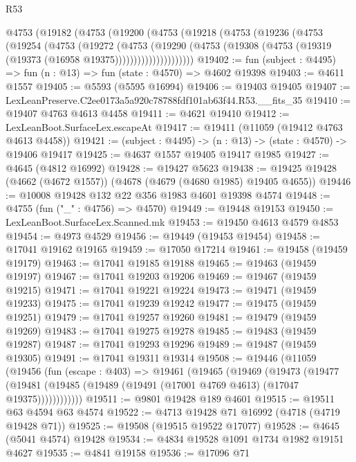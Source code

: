 \begin{lexlean}{R53}
\begin{coremodule}
      @4753
        (@19182
          (@4753
            (@19200
              (@4753
                (@19218
                  (@4753
                    (@19236
                      (@4753
                        (@19254
                          (@4753
                            (@19272
                              (@4753
                                (@19290
                                  (@4753
                                    (@19308
                                      (@4753 (@19319 (@19373 (@16958 @19375)))))))))))))))))))))
@19402 := fun (subject : @4495) => fun (n : @13) => fun (state : @4570) => @4602 @19398
@19403 := @4611 @1557
@19405 := @5593 (@5595 @16994)
@19406 := @19403 @19405
@19407 := LexLeanPreserve.C2ee0173a5a920c78788fdf101ab63f44.R53.__fits_35
@19410 := @19407 @4763 @4613 @4458
@19411 := @4621 @19410
@19412 := LexLeanBoot.SurfaceLex.escapeAt
@19417 := @19411 (@11059 (@19412 @4763 @4613 @4458))
@19421 := (subject : @4495) -> (n : @13) -> (state : @4570) -> @19406 @19417
@19425 := @4637 @1557 @19405 @19417 @1985
@19427 := @4645 (@4812 @16992)
@19428 := @19427 @5623
@19438 := @19425 @19428 (@4662 (@4672 @1557)) (@4678 (@4679 (@4680 @1985) @19405 @4655))
@19446 := @10008 @19428 @132 @22 @356 @1983 @4601 @19398 @4574
@19448 := @4755 (fun ("_" : @4756) => @4570)
@19449 := @19448 @19153
@19450 := LexLeanBoot.SurfaceLex.Scanned.mk
@19453 := @19450 @4613 @4579 @4853
@19454 := @4973 @4529
@19456 := @19449 (@19453 @19454)
@19458 := @17041 @19162 @19165
@19459 := @17050 @17214
@19461 := @19458 (@19459 @19179)
@19463 := @17041 @19185 @19188
@19465 := @19463 (@19459 @19197)
@19467 := @17041 @19203 @19206
@19469 := @19467 (@19459 @19215)
@19471 := @17041 @19221 @19224
@19473 := @19471 (@19459 @19233)
@19475 := @17041 @19239 @19242
@19477 := @19475 (@19459 @19251)
@19479 := @17041 @19257 @19260
@19481 := @19479 (@19459 @19269)
@19483 := @17041 @19275 @19278
@19485 := @19483 (@19459 @19287)
@19487 := @17041 @19293 @19296
@19489 := @19487 (@19459 @19305)
@19491 := @17041 @19311 @19314
@19508 := @19446
    (@11059
      (@19456
        (fun (escape : @403) =>
        @19461
          (@19465
            (@19469
              (@19473
                (@19477
                  (@19481 (@19485 (@19489 (@19491 (@17001 @4769 @4613) (@17047 @19375))))))))))))
@19511 := @9801 @19428 @189 @4601
@19515 := @19511 @63 @4594 @63 @4574
@19522 := @4713 @19428 @71 @16992 (@4718 (@4719 @19428 @71))
@19525 := @19508 (@19515 @19522 @17077)
@19528 := @4645 (@5041 @4574) @19428
@19534 := @4834 @19528 @1091 @1734 @1982 @19151 @4627
@19535 := @4841 @19158
@19536 := @17096 @71

\end{coremodule}
\end{lexlean}
